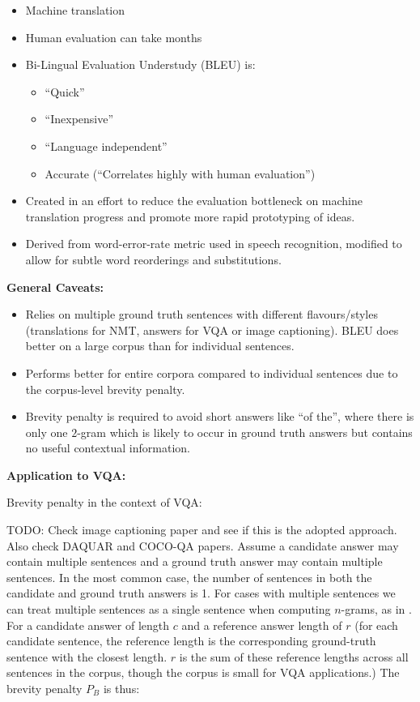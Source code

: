 \begin{itemize}
    \item Machine translation
    \item Human evaluation can take months
    \item Bi-Lingual Evaluation Understudy (BLEU) is:
    \begin{itemize}
        \item ``Quick''
        \item ``Inexpensive''
        \item ``Language independent''
        \item Accurate (``Correlates highly with human evaluation'')
    \end{itemize}
    \item Created in an effort to reduce the evaluation bottleneck on machine translation progress and promote more rapid prototyping of ideas.
    \item Derived from word-error-rate metric used in speech recognition, modified to allow for subtle word reorderings and substitutions.
\end{itemize}


\textbf{General Caveats:}

\begin{itemize}
    \item Relies on multiple ground truth sentences with different flavours/styles (translations for NMT, answers for VQA or image captioning). BLEU does better on a large corpus than for individual sentences.
    \item Performs better for entire corpora compared to individual sentences due to the corpus-level brevity penalty.
    \item Brevity penalty is required to avoid short answers like ``of the'', where there is only one \(2\)-gram which is likely to occur in ground truth answers but contains no useful contextual information.
\end{itemize}


\textbf{Application to VQA:}

Brevity penalty in the context of VQA:

{\color{red} TODO: Check image captioning paper and see if this is the adopted approach. Also check DAQUAR and COCO-QA papers.} Assume a candidate answer may contain multiple sentences and a ground truth answer may contain multiple sentences. In the most common case, the number of sentences in both the candidate and ground truth answers is 1. For cases with multiple sentences we can treat multiple sentences as a single sentence when computing \(n\)-grams, as in \cite{papineni2002bleu}. For a candidate answer of length \(c\) and a reference answer length of \(r\) (for each candidate sentence, the reference length is the corresponding ground-truth sentence with the closest length. \(r\) is the sum of these reference lengths across all sentences in the corpus, though the corpus is small for VQA applications.) The brevity penalty \(P_B\) is thus:

